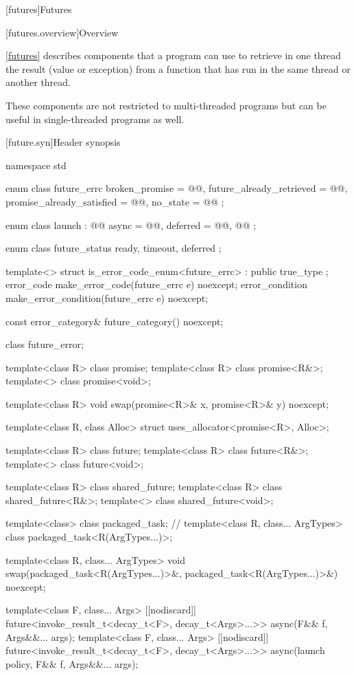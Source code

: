 [futures]{Futures}

[futures.overview]{Overview}

\pnum
\ref{futures} describes components that a \Cpp{} program can use to retrieve in one thread the
result (value or exception) from a function that has run in the same thread or another thread.
\begin{note}
These components are not restricted to multi-threaded programs but can be useful in
single-threaded programs as well.
\end{note}

[future.syn]{Header  synopsis}

%
%
\begin{codeblock}
namespace std {
  enum class future_errc {
    broken_promise = @@,
    future_already_retrieved = @@,
    promise_already_satisfied = @@,
    no_state = @@
  };

  enum class launch : @\unspec{}@ {
    async = @\unspec{}@,
    deferred = @\unspec{}@,
    @@
  };

  enum class future_status {
    ready,
    timeout,
    deferred
  };

  template<> struct is_error_code_enum<future_errc> : public true_type { };
  error_code make_error_code(future_errc e) noexcept;
  error_condition make_error_condition(future_errc e) noexcept;

  const error_category& future_category() noexcept;

  class future_error;

  template<class R> class promise;
  template<class R> class promise<R&>;
  template<> class promise<void>;

  template<class R>
    void swap(promise<R>& x, promise<R>& y) noexcept;

  template<class R, class Alloc>
    struct uses_allocator<promise<R>, Alloc>;

  template<class R> class future;
  template<class R> class future<R&>;
  template<> class future<void>;

  template<class R> class shared_future;
  template<class R> class shared_future<R&>;
  template<> class shared_future<void>;

  template<class> class packaged_task;  // \notdef
  template<class R, class... ArgTypes>
    class packaged_task<R(ArgTypes...)>;

  template<class R, class... ArgTypes>
    void swap(packaged_task<R(ArgTypes...)>&, packaged_task<R(ArgTypes...)>&) noexcept;

  template<class F, class... Args>
    [[nodiscard]] future<invoke_result_t<decay_t<F>, decay_t<Args>...>>
      async(F&& f, Args&&... args);
  template<class F, class... Args>
    [[nodiscard]] future<invoke_result_t<decay_t<F>, decay_t<Args>...>>
      async(launch policy, F&& f, Args&&... args);
}
\end{codeblock}

